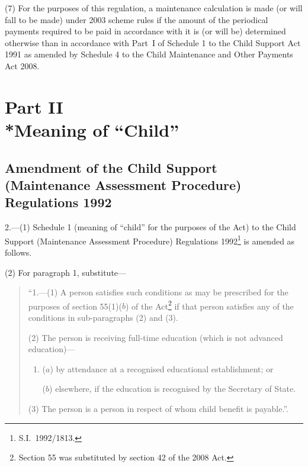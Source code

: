 \documentclass[12pt,a4paper]{article}
\begin{document}
(7) For the purposes of this regulation, a maintenance calculation is made (or will fall to be made) under 2003 scheme rules if the amount of the periodical payments required to be paid in accordance with it is (or will be) determined otherwise than in accordance with Part~I of Schedule 1 to the Child Support Act 1991 as amended by Schedule 4 to the Child Maintenance and Other Payments Act 2008.


\section[Part II --- Meaning of “Child”]{Part II\\*Meaning of “Child”}

\renewcommand\parthead{--- Part II}

\subsection[2. Amendment of the Child Support (Maintenance Assessment Procedure) Regulations 1992]{Amendment of the Child Support (Maintenance Assessment Procedure) Regulations 1992}

2.---(1)  Schedule 1 (meaning of “child” for the purposes of the Act) to the Child Support (Maintenance Assessment Procedure) Regulations 1992\footnote{S.I.~1992/1813.} is amended as follows.

(2) For paragraph 1, substitute—
\begin{quotation}
“1.---(1)   A person satisfies such conditions as may be prescribed for the purposes of section 55(1)($b$) of the Act\footnote{Section 55 was substituted by section 42 of the 2008 Act.} if that person satisfies any of the conditions in sub-paragraphs (2) and (3).

(2) The person is receiving full-time education (which is not advanced education)—
\begin{enumerate}\item[]
($a$) by attendance at a recognised educational establishment; or

($b$) elsewhere, if the education is recognised by the Secretary of State.
\end{enumerate}

(3) The person is a person in respect of whom child benefit is payable.”.
\end{quotation}
\end{document}
